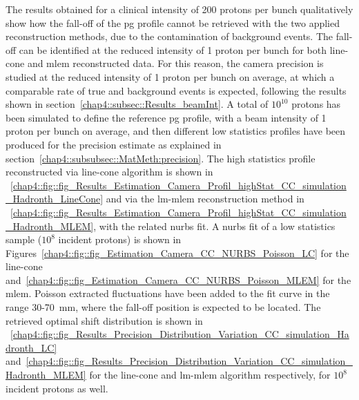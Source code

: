 The results obtained for a clinical intensity of 200 protons per bunch qualitatively show how the fall-off of the \gls{pg} profile cannot be retrieved with the two applied reconstruction methods, due to the contamination of background events. The fall-off can be identified at the reduced intensity of 1 proton per bunch for both line-cone and \gls{mlem} reconstructed data.
For this reason, the camera precision is studied at the reduced intensity of 1 proton per bunch on average, at which a comparable rate of true and background events is expected, following the results shown in section~\ref{chap4::subsec::Results_beamInt}.
A total of $10^{10}$ protons has been simulated to define the reference \gls{pg} profile, with a beam intensity of 1 proton per bunch on average, and then different low statistics profiles have been produced for the precision estimate as explained in section~\ref{chap4::subsubsec::MatMeth:precision}. 
The high statistics profile reconstructed via line-cone algorithm is shown in \figurename~\ref{chap4::fig::fig_Results_Estimation_Camera_Profil_highStat_CC_simulation_Hadronth_LineCone} and via the \gls{lm-mlem} reconstruction method in \figurename~\ref{chap4::fig::fig_Results_Estimation_Camera_Profil_highStat_CC_simulation_Hadronth_MLEM}, with the related \gls{nurbs} fit. A \gls{nurbs} fit of a low statistics sample ($10^8$ incident protons) is shown in Figures~\ref{chap4::fig::fig_Estimation_Camera_CC_NURBS_Poisson_LC} for the line-cone and~\ref{chap4::fig::fig_Estimation_Camera_CC_NURBS_Poisson_MLEM} for the \gls{mlem}. Poisson extracted fluctuations have been added to the fit curve in the range 30-70~mm, where the fall-off position is expected to be located.
The retrieved optimal shift distribution is shown in \figurename~\ref{chap4::fig::fig_Results_Precision_Distribution_Variation_CC_simulation_Hadronth_LC} and~\ref{chap4::fig::fig_Results_Precision_Distribution_Variation_CC_simulation_Hadronth_MLEM} for the line-cone and \gls{lm-mlem} algorithm respectively, for $10^8$ incident protons as well.


